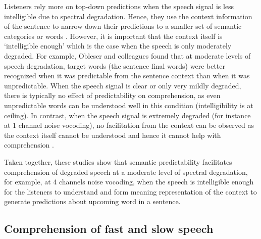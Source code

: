 \documentclass[a4paper, nobind]{templates/ociamthesis}
\begin{document}
Listeners rely more on top-down predictions when the speech signal is less intelligible due to spectral degradation.
Hence, they use the context information of the sentence to narrow down their predictions to a smaller set of semantic categories or words \autocites{Strauss2013}[see also,][]{Corps2020}.
However, it is important that the context itself is `intelligible enough' which is the case when the speech is only moderately degraded.
For example, Obleser and colleagues \autocite{Obleser2007,Obleser2010,Obleser2011} found that at moderate levels of speech degradation, target words (the sentence final words) were better recognized when it was predictable from the sentence context than when it was unpredictable.
When the speech signal is clear or only very mildly degraded, there is typically no effect of predictability on comprehension, as even unpredictable words can be understood well in this condition (intelligibility is at ceiling).
In contrast, when the speech signal is extremely degraded (for instance at 1 channel noise vocoding), no facilitation from the context can be observed as the context itself cannot be understood and hence it cannot help with comprehension \autocite{Bhandari2021,Obleser2010}.

Taken together, these studies show that semantic predictability facilitates comprehension of degraded speech at a moderate level of spectral degradation,
for example, at 4 channels noise vocoding,
when the speech is intelligible enough for the listeners to understand and form meaning representation of the context to generate predictions about upcoming word in a sentence.

\hypertarget{comprehension-of-fast-and-slow-speech}{%
\subsection{Comprehension of fast and slow speech}\label{comprehension-of-fast-and-slow-speech}}
\end{document}
